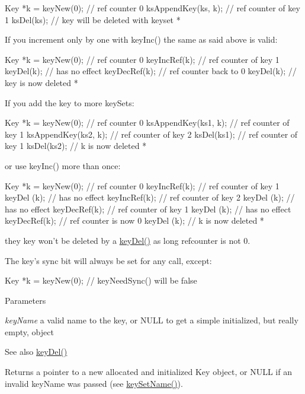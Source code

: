 \begin{DoxyCode}
Key *k = keyNew(0); // ref counter 0
ksAppendKey(ks, k); // ref counter of key 1
ksDel(ks); // key will be deleted with keyset
 *
\end{DoxyCode}


If you increment only by one with keyInc() the same as said above is valid:


\begin{DoxyCode}
Key *k = keyNew(0); // ref counter 0
keyIncRef(k); // ref counter of key 1
keyDel(k);    // has no effect
keyDecRef(k); // ref counter back to 0
keyDel(k);    // key is now deleted
 *
\end{DoxyCode}


If you add the key to more keySets:


\begin{DoxyCode}
Key *k = keyNew(0); // ref counter 0
ksAppendKey(ks1, k); // ref counter of key 1
ksAppendKey(ks2, k); // ref counter of key 2
ksDel(ks1); // ref counter of key 1
ksDel(ks2); // k is now deleted
 *
\end{DoxyCode}


or use keyInc() more than once:


\begin{DoxyCode}
Key *k = keyNew(0); // ref counter 0
keyIncRef(k); // ref counter of key 1
keyDel (k);   // has no effect
keyIncRef(k); // ref counter of key 2
keyDel (k);   // has no effect
keyDecRef(k); // ref counter of key 1
keyDel (k);   // has no effect
keyDecRef(k); // ref counter is now 0
keyDel (k); // k is now deleted
 *
\end{DoxyCode}


they key won't be deleted by a \hyperlink{group__key_ga3df95bbc2494e3e6703ece5639be5bb1}{keyDel()} as long refcounter is not 0.

The key's sync bit will always be set for any call, except: 
\begin{DoxyCode}
Key *k = keyNew(0);
// keyNeedSync() will be false
\end{DoxyCode}



\begin{DoxyParams}{Parameters}
\item[{\em keyName}]a valid name to the key, or NULL to get a simple initialized, but really empty, object \end{DoxyParams}
\begin{DoxySeeAlso}{See also}
\hyperlink{group__key_ga3df95bbc2494e3e6703ece5639be5bb1}{keyDel()} 
\end{DoxySeeAlso}
\begin{DoxyReturn}{Returns}
a pointer to a new allocated and initialized Key object, or NULL if an invalid {\ttfamily keyName} was passed (see \hyperlink{group__keyname_ga7699091610e7f3f43d2949514a4b35d9}{keySetName()}). 
\end{DoxyReturn}
